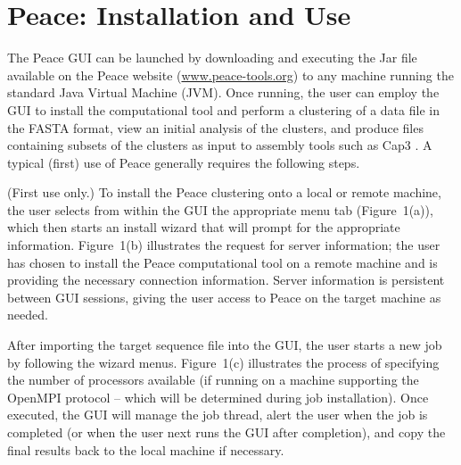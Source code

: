 \documentclass[a4,center,fleqn]{NAR}
\begin{document}
\enlargethispage{-65.1pt}

\section{{\sc Peace}: Installation and Use}

The {\sc Peace} GUI can be launched by downloading and executing the
Jar file available on the {\sc Peace} website
(\href{http://www.peace-tools.org}{www.peace-tools.org}) to any
machine running the standard Java Virtual Machine (JVM).  Once running,
the user can employ the GUI to install the computational tool and perform
a clustering of a data file in the FASTA format, view an initial
analysis of the clusters, and produce files containing subsets of the
clusters as input to assembly tools such as {\sc Cap3} \cite{Huang99}.
A typical (first) use of {\sc Peace} generally
requires the following steps.

 (First use only.)  To install the
{\sc Peace} clustering onto a local or remote machine, the
user selects from within the GUI the appropriate menu tab
(Figure~1(a)), which then starts an install wizard that will prompt
for the appropriate information.  Figure~1(b) illustrates the request
for server information; the user has chosen to install the {\sc Peace}
computational tool on a remote machine and is providing the necessary
connection information.  Server information is persistent between GUI
sessions, giving the user access to {\sc Peace} on the target machine
as needed.

 After importing the target sequence file into
the GUI, the user starts a new job by following the wizard menus.
Figure~1(c) illustrates the process of specifying the number of
processors available (if running on a machine supporting the OpenMPI
protocol -- which will be determined during job installation).  Once
executed, the GUI will manage the job thread, alert the user when the
job is completed (or when the user next runs the GUI after completion),
and copy the final results back to the local machine if necessary.
\end{document}
